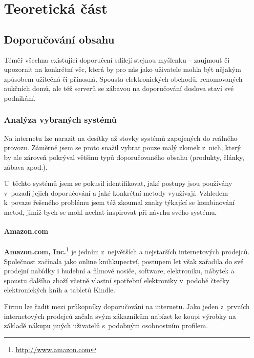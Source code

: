 \documentclass[thesis=M,czech]{FITthesis}[2014/05/07]
\begin{document}
\chapter{Teoretická část}		
\label{chap:teor}

\section{Doporučování obsahu}	
\label{chap:current}

Téměř všechna existující doporučení sdílejí stejnou myšlenku – zaujmout či upozornit na konkrétní věc, která by pro nás jako uživatele mohla být nějakým způsobem užitečná či přínosná. Spousta elektronických obchodů, renomovaných aukčních domů, ale též serverů se zábavou na doporučování doslova staví své podnikání.

\subsection{Analýza vybraných systémů}
\label{sec:examples}
Na internetu lze narazit na desítky až stovky systémů zapojených do reálného provozu. Záměrně jsem se proto snažil vybrat pouze malý zlomek z~nich, který by ale zároveň pokrýval většinu typů doporučovaného obsahu (produkty, články, zábava apod.).

U~těchto systémů jsem se pokusil identifikovat, jaké postupy jsou používány v~pozadí jejich doporučování a jaké konkrétní metody využívají. Vzhledem k~povaze řešeného problému jsem též zkoumal znaky týkající se kombinování metod, jimiž bych se mohl nechat inspirovat při návrhu svého systému.

\subsubsection{Amazon.com}

\textbf{Amazon.com, Inc.}\footnote{\url{http://www.amazon.com}} je jedním z~největších a nejstarších internetových prodejců. Společnost začínala jako online knihkupectví, postupem let však zařadila do své prodejní nabídky i hudební a filmové nosiče, software, elektroniku, nábytek a spoustu dalšího zboží včetně vlastní spotřební elektroniky v~podobě čtečky elektronických knih a tabletů Kindle.

Firmu lze řadit mezi průkopníky doporučování na internetu. Jako jeden z~prvních internetových prodejců začala svým zákazníkům nabízet ke koupi výrobky na základě nákupu jiných uživatelů s~podobným osobnostním profilem.
\end{document}
